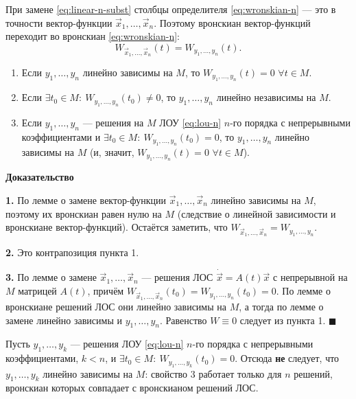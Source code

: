 \documentclass[12pt,a4paper]{article}
\numberwithin{equation}{section}
\newcommand{\vect}[1]{\vec{#1}}
\renewenvironment{proof}[1][Доказательство]{\begin{center}\textbf{#1}\end{center}}{\hfill$\blacksquare$\par}
\begin{document}
\begin{remarkHSE}
При замене \eqref{eq:linear-n-subst} столбцы определителя \eqref{eq:wronskian-n} --- это в точности вектор-функции \(\vect{x}_1,\ldots,\vect{x}_n\). Поэтому вронскиан вектор-функций переходит во вронскиан \eqref{eq:wronskian-n}:
\[
W_{\vect{x}_1,\ldots,\vect{x}_n}(t)=W_{y_1,\ldots,y_n}(t).
\]
\end{remarkHSE}

\begin{theoremHSE}
\begin{enumerate}
\item Если \(y_1,\ldots,y_n\) линейно зависимы на \(M\), то \(W_{y_1,\ldots,y_n}(t)=0\) \(\forall t\in M\).
\item Если \(\exists t_0\in M:\ W_{y_1,\ldots,y_n}(t_0)\neq0\), то \(y_1,\ldots,y_n\) линейно независимы на \(M\).
\item Если \(y_1,\ldots,y_n\) --- решения на \(M\) ЛОУ \eqref{eq:lou-n} \(n\)-го порядка с непрерывными коэффициентами и \(\exists t_0\in M:\ W_{y_1,\ldots,y_n}(t_0)=0\), то \(y_1,\ldots,y_n\) линейно зависимы на \(M\) (и, значит, \(W_{y_1,\ldots,y_n}(t)=0\) \(\forall t\in M\)).
\end{enumerate}
\end{theoremHSE}

\begin{proof}
\textbf{1.} По лемме о замене вектор-функции \(\vect{x}_1,\ldots,\vect{x}_n\) линейно зависимы на \(M\), поэтому их вронскиан равен нулю на \(M\) (следствие о линейной зависимости и вронскиане вектор-функций). Остаётся заметить, что \(W_{\vect{x}_1,\ldots,\vect{x}_n}=W_{y_1,\ldots,y_n}\).

\textbf{2.} Это контрапозиция пункта 1.

\textbf{3.} По лемме о замене \(\vect{x}_1,\ldots,\vect{x}_n\) --- решения ЛОС \(\dot{\vect{x}}=A(t)\vect{x}\) с непрерывной на \(M\) матрицей \(A(t)\), причём \(W_{\vect{x}_1,\ldots,\vect{x}_n}(t_0)=W_{y_1,\ldots,y_n}(t_0)=0\). По лемме о вронскиане решений ЛОС они линейно зависимы на \(M\), а тогда по лемме о замене линейно зависимы и \(y_1,\ldots,y_n\). Равенство \(W\equiv0\) следует из пункта 1.
\end{proof}

\begin{remarkHSE}
Пусть \(y_1,\ldots,y_k\) --- решения ЛОУ \eqref{eq:lou-n} \(n\)-го порядка с непрерывными коэффициентами, \(k<n\), и \(\exists t_0\in M:\ W_{y_1,\ldots,y_k}(t_0)=0\). Отсюда \textbf{не} следует, что \(y_1,\ldots,y_k\) линейно зависимы на \(M\): свойство 3 работает только для \(n\) решений, вронскиан которых совпадает с вронскианом решений ЛОС.
\end{remarkHSE}
\end{document}
